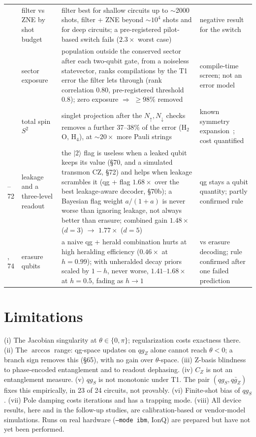 \documentclass[11pt]{article}
\newcommand{\qgZ}{qg_Z}
\newcommand{\qgS}{qg_S}
\begin{document}
{\begin{longtable}{>{\raggedright\arraybackslash}p{0.9cm}>{\raggedright\arraybackslash}p{4.0cm}>{\raggedright\arraybackslash}p{5.8cm}>{\raggedright\arraybackslash}p{3.2cm}}
67 & filter vs ZNE by shot budget & filter best for shallow circuits up to $\sim$2000 shots, filter + ZNE beyond $\sim10^4$ shots and for deep circuits; a pre-registered pilot-based switch fails ($2.3\times$ worst case) & negative result for the switch \\
68 & sector exposure & population outside the conserved sector after each two-qubit gate, from a noiseless statevector, ranks compilations by the T1 error the filter lets through (rank correlation 0.80, pre-registered threshold 0.8); zero exposure $\Rightarrow$ $\ge98\%$ removed & compile-time screen; not an error model \\
69 & total spin $S^2$ & singlet projection after the $N_\uparrow,N_\downarrow$ checks removes a further 37--38\% of the error (H$_2$O, H$_4$), at $\sim20\times$ more Pauli strings & known symmetry expansion~\cite{bonetmonroig2018}; cost quantified \\
70--72 & leakage and a three-level readout & the $|2\rangle$ flag is useless when a leaked qubit keeps its value (\S70, and a simulated transmon CZ, \S72) and helps when leakage scrambles it (qg + flag $1.68\times$ over the best leakage-aware decoder, \S70b); a Bayesian flag weight $a/(1+a)$ is never worse than ignoring leakage, not always better than erasure; combined gain $1.48\times$ ($d=3$) $\to$ $1.77\times$ ($d=5$) & qg stays a qubit quantity; partly confirmed rule \\
73, 74 & erasure qubits & a naive qg + herald combination hurts at high heralding efficiency ($0.46\times$ at $h=0.99$); with unheralded decay priors scaled by $1-h$, never worse, $1.41$--$1.68\times$ at $h=0.5$, fading as $h\to1$ & vs erasure decoding; rule confirmed after one failed prediction \\
\bottomrule
\end{longtable}
}

\section{Limitations}\label{sec:limits}

(i) The Jacobian singularity at $\theta\in\{0,\pi\}$; regularization costs exactness there.
(ii) The $\arccos$ range: qg-space updates on $\qgZ$ alone cannot reach $\theta<0$; a branch sign removes this (\S65), with no gain over $\theta$-space.
(iii) Z-basis blindness to phase-encoded entanglement and to readout dephasing.
(iv) $C_Z$ is not an entanglement measure.
(v) $\qgS$ is not monotonic under T1. The pair $(\qgS,\bar{\qgZ})$ fixes this empirically, in
23 of 24 circuits, not provably.
(vi) Finite-shot bias of $\qgS$.
(vii) Pole damping costs iterations and has a trapping mode.
(viii) All device results, here and in the follow-up studies, are calibration-based or
vendor-model simulations. Runs on real hardware (\texttt{--mode ibm}, IonQ) are prepared but have
not yet been performed.
\end{document}
